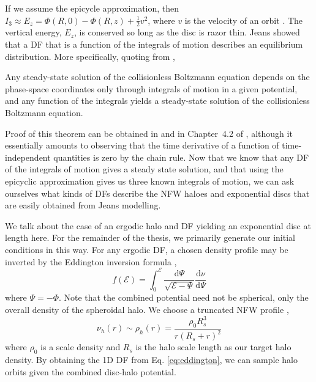 If we assume the epicycle approximation, then $I_3 \approx E_z = \Phi(R,0) - \Phi(R,z) + \frac{1}{2} v^2$, where $v$ is the velocity of an orbit \citep{kd95galactics}. The vertical energy, $E_z$, is conserved so long as the disc is razor thin. Jeans showed that a DF that is a function of the integrals of motion describes an equilibrium distribution. More specifically, quoting from \citet{BT},
\begin{theorem}
Any steady-state solution of the collisionless Boltzmann equation depends on the phase-space coordinates only through integrals of motion in a given potential, and any function of the integrals yields a steady-state solution of the collisionless Boltzmann equation.
\end{theorem}
Proof of this theorem can be obtained in \citet{jeans_1915} and in Chapter~4.2 of \citet{BT}, although it essentially amounts to observing that the time derivative of a function of time-independent quantities is zero by the chain rule. Now that we know that any DF of the integrals of motion gives a steady state solution, and that using the epicyclic approximation gives us three known integrals of motion, we can ask ourselves what kinds of DFs describe the NFW haloes and exponential discs that are easily obtained from Jeans modelling.

We talk about the case of an ergodic halo and DF yielding an exponential disc at length here. For the remainder of the thesis, we primarily generate our initial conditions in this way. For any ergodic DF, a chosen density profile may be inverted by the Eddington inversion formula \citep{BT},
\begin{equation}
f(\mathcal{E}) = \int_0^{\mathcal{E}} \frac{\text{d} \Psi}{\sqrt{\mathcal{E} - \Psi}} \frac{\text{d} \nu}{\text{d} \Psi} \label{eq:eddington}
\end{equation}
where $\Psi = - \Phi$. Note that the combined potential need not be spherical, only the overall density of the spheroidal halo. We choose a truncated NFW profile \citep{nfw},
\begin{equation}
\nu_h(r) \sim \rho_{h}(r) = \frac{\rho_0 R_s^3}{r (R_s + r)^2}
\end{equation}
where $\rho_0$ is a scale density and $R_s$ is the halo scale length as our target halo density. By obtaining the 1D DF from Eq. \eqref{eq:eddington}, we can sample halo orbits given the combined disc-halo potential.

